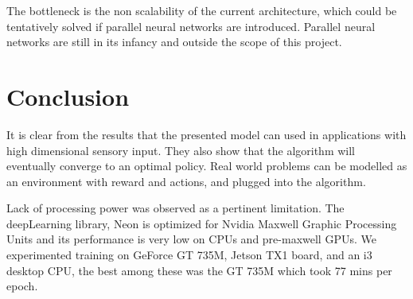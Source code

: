 \documentclass[a4paper,11pt]{article}
\begin{document}
				The bottleneck is the non scalability of the current architecture, which could be tentatively solved if parallel neural networks are introduced. Parallel neural networks are still in its infancy and outside the scope of this project.
	\section{Conclusion}
		It is clear from the results that the presented model can used in applications with high dimensional sensory input. They also show that the algorithm will eventually converge to an optimal policy. Real world problems can be modelled as an environment with reward and actions, and plugged into the algorithm.

		Lack of processing power was observed as a pertinent limitation. The deepLearning library, Neon is optimized for Nvidia Maxwell Graphic Processing Units and its performance is very low on CPUs and pre-maxwell GPUs. We experimented training on GeForce GT 735M, Jetson TX1 board, and an i3 desktop CPU, the best among these was the GT 735M which took 77 mins per epoch.


	\newpage
	\nocite{*}
	
	
\end{document}
